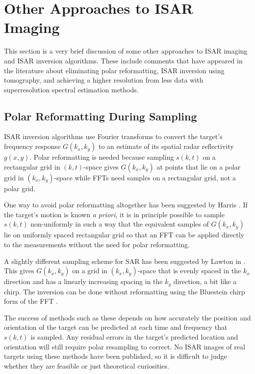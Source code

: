 \section{Other Approaches to ISAR Imaging}

This section is a very brief discussion of some other approaches to ISAR
imaging and ISAR inversion algorithms.  These include comments that have
appeared in the literature about eliminating polar reformatting, ISAR
inversion using tomography, and achieving a higher resolution from less
data with superresolution spectral estimation methods.

\subsection{Polar Reformatting During Sampling}

ISAR inversion algorithms use Fourier transforms to convert the target's
frequency response $G(k_x,k_y)$ to an estimate of its spatial radar
reflectivity $g(x,y)$.  Polar reformatting is needed because sampling
$s(k,t)$ on a rectangular grid in $(k,t)$-space gives $G(k_x,k_y)$ at points
that lie on a polar grid in $(k_x,k_y)$-space while FFTs need samples on a
rectangular grid, not a polar grid.

One way to avoid polar reformatting altogether has been suggested by Harris
\cite{Har90a}.  If the target's motion is known {\em a priori\/}, it is in
principle possible to sample  $s(k,t)$ non-uniformly in such a way that the
equivalent samples of $G(k_x,k_y)$ lie on uniformly spaced rectangular grid
so that an FFT can be applied directly to the measurements without the need
for polar reformatting.

A slightly different sampling scheme for SAR has been suggested by Lawton in
\cite{Law88}.  This gives $G(k_x,k_y)$ on a grid in $(k_x,k_y)$-space that
is evenly spaced in the $k_x$ direction and has a linearly increasing
spacing in the $k_y$ direction, a bit like a chirp.  The inversion can be
done without reformatting using the Bluestein chirp form of the FFT
\cite{Blu70}.

The success of methods such as these depends on how accurately the position
and orientation of the target can be predicted at each time and frequency that
$s(k,t)$ is sampled.  Any residual errors in the target's predicted location
and orientation will still require polar resampling to correct.  No ISAR
images of real targets using these methods have been published, so it is
difficult to judge whether they are feasible or just theoretical
curiosities.

